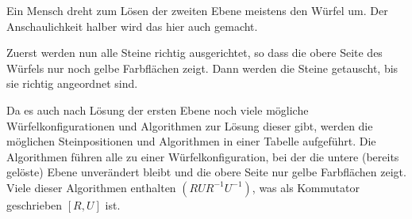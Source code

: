 \documentclass[12pt,a4paper, usenames, dvipsnames]{article}
\theoremstyle{mystyle}
\theoremstyle{definition}
\begin{document}
Ein Mensch dreht zum Lösen der zweiten Ebene meistens den Würfel um. Der Anschaulichkeit halber wird das hier auch gemacht.

Zuerst werden nun alle Steine richtig ausgerichtet, so dass die obere Seite des Würfels nur noch gelbe Farbflächen zeigt. Dann werden die Steine getauscht, bis sie richtig angeordnet sind.

Da es auch nach Lösung der ersten Ebene noch viele mögliche Würfelkonfigurationen und Algorithmen zur Lösung dieser gibt, werden die möglichen Steinpositionen und Algorithmen in einer Tabelle aufgeführt. Die Algorithmen führen alle zu einer Würfelkonfiguration, bei der die untere (bereits gelöste) Ebene unverändert bleibt und die obere Seite nur gelbe Farbflächen zeigt.
Viele dieser Algorithmen enthalten $(R U R^{-1} U^{-1})$, was als Kommutator geschrieben $[ R,U ]$ ist.
\end{document}
